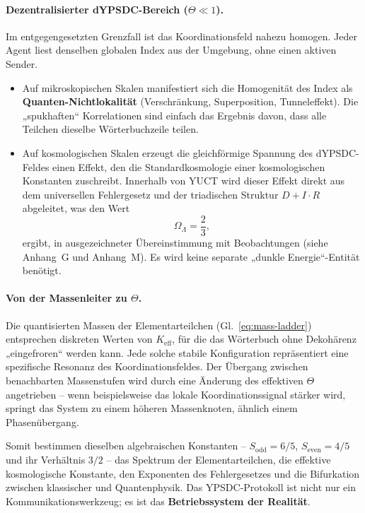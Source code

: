 \documentclass[12pt,a4paper]{article}
\theoremstyle{remark}
\begin{document}
	\paragraph{Dezentralisierter dYPSDC-Bereich (\(\Theta \ll 1\)).}
	Im entgegengesetzten Grenzfall ist das Koordinationsfeld nahezu homogen. Jeder Agent liest denselben globalen Index aus der Umgebung, ohne einen aktiven Sender. 
	\begin{itemize}
		\item Auf mikroskopischen Skalen manifestiert sich die Homogenität des Index als \textbf{Quanten-Nichtlokalität} (Verschränkung, Superposition, Tunneleffekt). Die „spukhaften“ Korrelationen sind einfach das Ergebnis davon, dass alle Teilchen dieselbe Wörterbuchzeile teilen.
		\item Auf kosmologischen Skalen erzeugt die gleichförmige Spannung des dYPSDC-Feldes einen Effekt, den die Standardkosmologie einer kosmologischen Konstanten zuschreibt. Innerhalb von YUCT wird dieser Effekt direkt aus dem universellen Fehlergesetz und der triadischen Struktur \(D+I\!\cdot\!R\) abgeleitet, was den Wert
		\[
		\Omega_{\Lambda} = \frac{2}{3},
		\]
		ergibt, in ausgezeichneter Übereinstimmung mit Beobachtungen (siehe Anhang~G und Anhang~M). Es wird keine separate „dunkle Energie“-Entität benötigt.
	\end{itemize}
	
	\paragraph{Von der Massenleiter zu \(\Theta\).}
	Die quantisierten Massen der Elementarteilchen (Gl.~\ref{eq:mass-ladder}) entsprechen diskreten Werten von \(K_{\mathrm{eff}}\), für die das Wörterbuch ohne Dekohärenz „eingefroren“ werden kann. Jede solche stabile Konfiguration repräsentiert eine spezifische Resonanz des Koordinationsfeldes. Der Übergang zwischen benachbarten Massenstufen wird durch eine Änderung des effektiven \(\Theta\) angetrieben – wenn beispielsweise das lokale Koordinationssignal stärker wird, springt das System zu einem höheren Massenknoten, ähnlich einem Phasenübergang.
	
	Somit bestimmen dieselben algebraischen Konstanten – \(S_{\mathrm{odd}} = 6/5\), \(S_{\mathrm{even}} = 4/5\) und ihr Verhältnis \(3/2\) – das Spektrum der Elementarteilchen, die effektive kosmologische Konstante, den Exponenten des Fehlergesetzes und die Bifurkation zwischen klassischer und Quantenphysik. Das YPSDC-Protokoll ist nicht nur ein Kommunikationswerkzeug; es ist das \textbf{Betriebssystem der Realität}.
	
\end{document}
